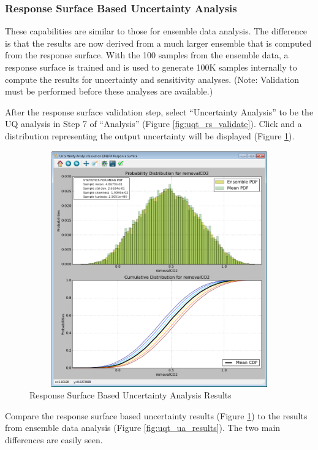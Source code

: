 \subsubsection{Response Surface Based Uncertainty Analysis}

These capabilities are similar to those for ensemble data analysis. The difference is that the results are now derived from a much larger ensemble that is computed from the response surface. With the 100 samples from the ensemble data, a response surface is trained and is used to generate 100K samples internally to compute the results for uncertainty and sensitivity analyses. (Note: Validation must be performed before these analyses are available.)

After the response surface validation step, select ``Uncertainty Analysis''
to be the UQ analysis in Step 7 of ``Analysis'' (Figure
\ref{fig:uqt_rs_validate}). Click  and a distribution
representing the output uncertainty will be displayed (Figure \ref{fig:uqt_rsua_results}).

\begin{figure}[H]
\centering \includegraphics[width=6.5in,height=4in,keepaspectratio]{Chapt_uq/figs/tutorial/24_RSUAResults}
\caption{Response Surface Based Uncertainty Analysis Results}
\label{fig:uqt_rsua_results}
\end{figure}

Compare the response surface based uncertainty results (Figure \ref{fig:uqt_rsua_results}) to the results from ensemble data analysis (Figure \ref{fig:uqt_ua_results}). The two main differences are easily seen.

